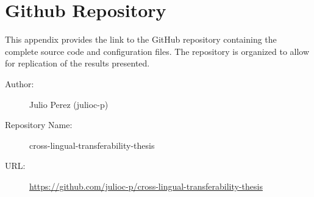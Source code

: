 \section{Github Repository}
This appendix provides the link to the GitHub repository containing the complete source code and configuration files.
The repository is organized to allow for replication of the results presented.

\begin{description}
    \item[Author:] Julio Perez (julioc-p)
    \item[Repository Name:] cross-lingual-transferability-thesis
    \item[URL:] \url{https://github.com/julioc-p/cross-lingual-transferability-thesis}
\end{description}

